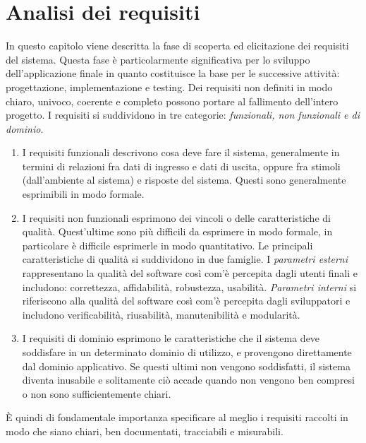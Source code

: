 \documentclass[12pt]{report}
\begin{document}
\chapter{Analisi dei requisiti}
In questo capitolo viene descritta la fase di scoperta ed elicitazione dei requisiti del sistema. Questa fase è particolarmente significativa per lo sviluppo dell'applicazione finale in quanto costituisce la base per le successive attività: progettazione, implementazione e testing. Dei requisiti non definiti in modo chiaro, univoco, coerente e completo possono portare al fallimento dell'intero progetto. I requisiti si suddividono in tre categorie: \textit{funzionali, non funzionali e di dominio}.
\begin{enumerate}[]
\item I requisiti funzionali descrivono cosa deve fare il sistema, generalmente
in termini di relazioni fra dati di ingresso e dati di uscita, oppure fra stimoli (dall’ambiente al sistema) e risposte del sistema. Questi sono
generalmente esprimibili in modo formale.

\item I requisiti non funzionali esprimono dei vincoli o delle caratteristiche di
qualità. Quest'ultime sono più difficili da esprimere in modo formale, in
particolare è difficile esprimerle in modo quantitativo. Le principali caratteristiche di qualità
 si suddividono in due famiglie. I \textit{parametri esterni} rappresentano la qualità del software così com'è percepita dagli utenti finali e includono: correttezza,  affidabilità, robustezza, usabilità. \textit{Parametri interni} si riferiscono alla qualità del software così com'è percepita dagli sviluppatori e includono verificabilità, riusabilità, manutenibilità e modularità.
\item I requisiti di dominio esprimono le caratteristiche che il sistema deve soddisfare in un determinato dominio di utilizzo, e provengono direttamente dal dominio applicativo. Se questi ultimi non vengono soddisfatti, il sistema diventa inusabile e solitamente ciò accade quando non vengono ben compresi o non sono sufficientemente chiari.
\end{enumerate}
È quindi di fondamentale importanza specificare al meglio i requisiti raccolti in modo che siano chiari, ben documentati, tracciabili e misurabili.%
\end{document}
